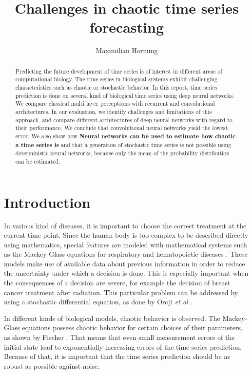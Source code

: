 \documentclass{article}
\title{Challenges in chaotic time series forecasting}
\author{Maximilian Hornung}
\begin{document}
\maketitle
 
\begin{abstract}
  Predicting the future development of time series is of interest in different
  areas of computational biology. The time series in biological systems exhibit
  challenging characteristics such as chaotic or stochastic behavior. In this
  report, time series prediction is done on several kind of biological time
  series using deep neural networks. We compare classical multi layer 
  perceptrons with recurrent and convolutional architectures.
  In our evaluation, we identify challenges
  and limitations of this approach, and compare different architectures of
  deep neural networks with regard to their performance. We conclude that 
  convolutional neural networks yield the lowest error. We also show how
  \textbf{Neural networks can be used to estimate how chaotic a time series is}
  and that a generation of stochastic time series is not possible using 
  deterministic neural networks, because only the mean of the probability 
  distribution can be estimated.
\end{abstract}

\section{Introduction}

In various kind of diseases, it is important to choose the correct treatment at
the current time point. Since the human body is too complex to be described
directly using mathematics, special features are modeled with mathematical
systems such as the Mackey-Glass equations for respiratory and hematopoietic
diseases \cite{mackey1977}. These models make use of available data about
previous information in order to reduce the uncertainty under which a decision
is done. This is especially important when the consequences of a decision are
severe, for example the decision of breast cancer treatment after radiation.
This particular problem can be addressed by using a stochastic differential
equation, as done by Oroji \textit{et al} \cite{oroji2016}.

In different kinds of biological models, chaotic behavior is observed. The
Mackey-Glass equations possess chaotic behavior for certain choices of their
parameters, as shown by Fischer \cite{farmer1982}. That means that even small
measurement errors of the initial state lead to exponentially increasing
errors of the time series prediction. Because of that, it is important
that the time series prediction should be as robust as possible against noise.
\end{document}
